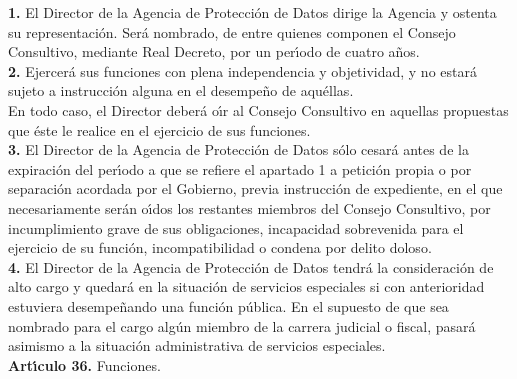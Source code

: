 {\bf 1.} El Director de la Agencia de Protecci\'on de Datos dirige la Agencia y 
ostenta su representaci\'on. Ser\'a nombrado, de entre quienes componen el 
Consejo Consultivo, mediante Real Decreto, por un per\'{\i}odo de cuatro 
a\~nos.\\

{\bf 2.} Ejercer\'a sus funciones con plena independencia y objetividad, y no 
estar\'a sujeto a instrucci\'on alguna en el desempe\~no de aqu\'ellas.\\
En todo caso, el Director deber\'a o\'{\i}r al Consejo Consultivo en aquellas 
propuestas que \'este le realice en el ejercicio de sus funciones.\\

{\bf 3.} El Director de la Agencia de Protecci\'on de Datos s\'olo cesar\'a 
antes de la expiraci\'on del per\'{\i}odo a que se refiere el apartado 1 a 
petici\'on propia o por separaci\'on acordada por el Gobierno, previa 
instrucci\'on de expediente, en el que necesariamente ser\'an o\'{\i}dos los 
restantes miembros del Consejo Consultivo, por incumplimiento grave de sus 
obligaciones, incapacidad sobrevenida para el ejercicio de su funci\'on, 
incompatibilidad o condena por delito doloso.\\

{\bf 4.} El Director de la Agencia de Protecci\'on de Datos tendr\'a la 
consideraci\'on de alto cargo y quedar\'a en la situaci\'on de servicios 
especiales si con anterioridad estuviera desempe\~nando una funci\'on 
p\'ublica. En el supuesto de que sea nombrado para el cargo alg\'un miembro de 
la carrera judicial o fiscal, pasar\'a asimismo a la situaci\'on administrativa 
de servicios especiales.
\vspace{0.3cm}\\
{\large {\bf Art\'{\i}culo 36.} Funciones.}

